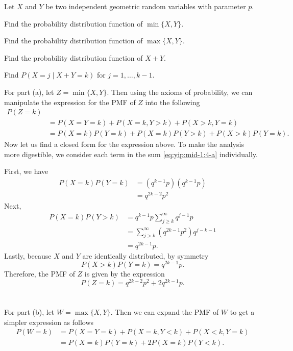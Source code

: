 \begin{problem}
  Let \(X\) and \(Y\) be two independent geometric random variables with
  parameter \(p\).
  \begin{alphlist}
  \item Find the probability distribution function of \(\min\{X,Y\}\).
  \item Find the probability distribution function of \(\max\{X,Y\}\).
  \item Find the probability distribution function of \(X+Y\).
  \item Find \(P(X=j\mid X+Y=k)\) for \(j=1,\dotsc,k-1\).
  \end{alphlist}
\end{problem}
\begin{solution*}
  For part (a), let \(Z=\min\{X,Y\}\). Then using the axioms of
  probability, we can manipulate the expression for the PMF of \(Z\) into
  the following
  \begin{equation}
    \label{eq:yip:mid-1:4-a}
    \begin{aligned}
      P(Z=k)\\
      &=P(X=Y=k)+P(X=k,Y>k)+P(X>k,Y=k)\\
      &=P(X=k)P(Y=k)+P(X=k)P(Y>k)+P(X>k)P(Y=k).
    \end{aligned}
  \end{equation}
  Now let us find a closed form for the expression above. To make the
  analysis more digestible, we consider each term in the sum
  \eqref{eq:yip:mid-1:4-a} individually.

  First, we have
  \begin{align*}
    P(X=k)P(Y=k)
    &=(q^{k-1}p)(q^{k-1}p)\\
    &=q^{2k-2}p^2
  \end{align*}
  Next,
  \begin{align*}
    P(X=k)P(Y>k)
    &=q^{k-1}p\sum_{j\geq k}^\infty q^{j-1}p\\
    &=\sum_{j>k}^\infty (q^{2k-1}p^2)q^{j-k-1}\\
    &=q^{2k-1}p.
  \end{align*}
  Lastly, because \(X\) and \(Y\) are identically distributed, by symmetry
  \[
    P(X>k)P(Y=k)=q^{2k-1}p.
  \]
  Therefore, the PMF of \(Z\) is given by the expression
  \[
    P(Z=k)=q^{2k-2}p^2+2q^{2k-1}p.
  \]
  \\\\
  For part (b), let \(W=\max\{X,Y\}\). Then we can expand the PMF of \(W\)
  to get a simpler expression as follows
  \begin{equation}
    \label{eq:yip:mid-1:4-b}
    \begin{aligned}
      P(W=k)
      &=P(X=Y=k)+P(X=k,Y<k)+P(X<k,Y=k)\\
      &=P(X=k)P(Y=k)+2P(X=k)P(Y<k).
    \end{aligned}
  \end{equation}


\end{solution*}
